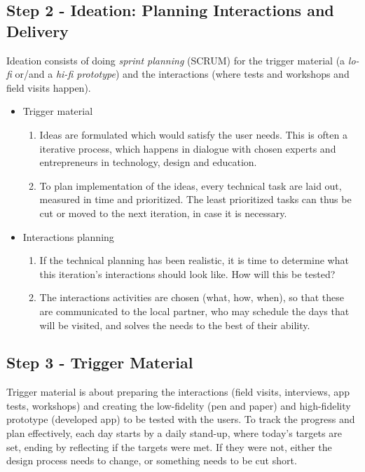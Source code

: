 \subsection{Step 2 - Ideation: Planning Interactions and Delivery}
  Ideation consists of doing \textit{sprint planning} (SCRUM) for the trigger material (a \textit{lo-fi} or/and a \textit{hi-fi prototype}) and the interactions (where tests and workshops and field visits happen).

    \begin{itemize}
    \item Trigger material
      \begin{enumerate}
      \item Ideas are formulated which would satisfy the user needs. This is often a iterative process, which happens in dialogue with chosen experts and entrepreneurs in technology, design and education.
      \item To plan implementation of the ideas, every technical task are laid out, measured in time and prioritized. The least prioritized tasks can thus be cut or moved to the next iteration, in case it is necessary.
      \end{enumerate}
    \item Interactions planning
      \begin{enumerate}
      \item If the technical planning has been realistic, it is time to determine what this iteration's interactions should look like. How will this be tested?
      \item The interactions activities are chosen (what, how, when), so that these are communicated to the local partner, who may schedule the days that will be visited, and solves the needs to the best of their ability.
      \end{enumerate}
    \end{itemize}

  \subsection{Step 3 - Trigger Material}
  Trigger material is about preparing the interactions (field visits, interviews, app tests, workshops) and creating the low-fidelity (pen and paper) and high-fidelity prototype (developed app) to be tested with the users. To track the progress and plan effectively, each day starts by a daily stand-up, where today's targets are set, ending by reflecting if the targets were met. If they were not, either the design process needs to change, or something needs to be cut short.

